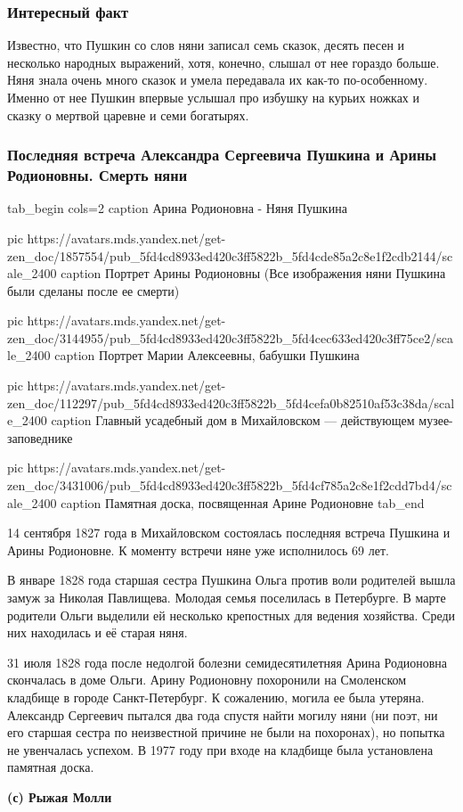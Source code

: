 \subsubsection{Интересный факт}

Известно, что Пушкин со слов няни записал семь сказок, десять песен и несколько
народных выражений, хотя, конечно, слышал от нее гораздо больше. Няня знала
очень много сказок и умела передавала их как-то по-особенному. Именно от нее
Пушкин впервые услышал про избушку на курьих ножках и сказку о мертвой царевне
и семи богатырях.

\subsubsection{Последняя встреча Александра Сергеевича Пушкина и Арины Родионовны. Смерть няни}

\ifcmt
tab_begin cols=2
	caption Арина Родионовна - Няня Пушкина 

  pic https://avatars.mds.yandex.net/get-zen_doc/1857554/pub_5fd4cd8933ed420c3ff5822b_5fd4cde85a2c8e1f2cdb2144/scale_2400
  caption Портрет Арины Родионовны (Все изображения няни Пушкина были сделаны после ее смерти)

  pic https://avatars.mds.yandex.net/get-zen_doc/3144955/pub_5fd4cd8933ed420c3ff5822b_5fd4cec633ed420c3ff75ce2/scale_2400
  caption Портрет Марии Алексеевны, бабушки Пушкина

  pic https://avatars.mds.yandex.net/get-zen_doc/112297/pub_5fd4cd8933ed420c3ff5822b_5fd4cefa0b82510af53c38da/scale_2400
  caption Главный усадебный дом в Михайловском — действующем музее-заповеднике

  pic https://avatars.mds.yandex.net/get-zen_doc/3431006/pub_5fd4cd8933ed420c3ff5822b_5fd4cf785a2c8e1f2cdd7bd4/scale_2400
  caption Памятная доска, посвященная Арине Родионовне
tab_end
\fi

14 сентября 1827 года в Михайловском состоялась последняя встреча Пушкина и
Арины Родионовне. К моменту встречи няне уже исполнилось 69 лет.

В январе 1828 года старшая сестра Пушкина Ольга против воли родителей вышла
замуж за Николая Павлищева. Молодая семья поселилась в Петербурге. В марте
родители Ольги выделили ей несколько крепостных для ведения хозяйства. Среди
них находилась и её старая няня.

31 июля 1828 года после недолгой болезни семидесятилетняя Арина Родионовна
скончалась в доме Ольги. Арину Родионовну похоронили на Смоленском кладбище в
городе Санкт-Петербург. К сожалению, могила ее была утеряна. Александр
Сергеевич пытался два года спустя найти могилу няни (ни поэт, ни его старшая
сестра по неизвестной причине не были на похоронах), но попытка не увенчалась
успехом. В 1977 году при входе на кладбище была установлена памятная доска.

\textbf{(с) Рыжая Молли}
